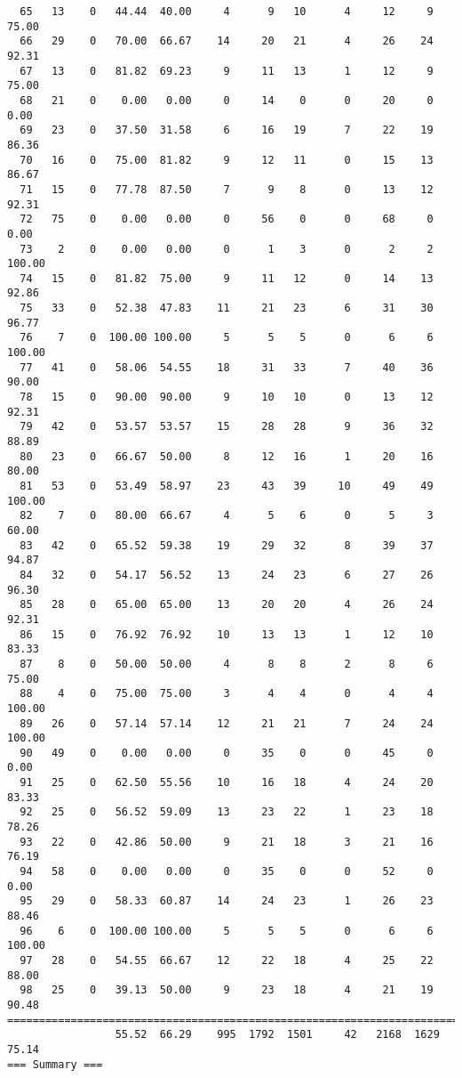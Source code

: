 \begin{verbatim}
  65   13    0   44.44  40.00     4      9   10      4     12     9    75.00
  66   29    0   70.00  66.67    14     20   21      4     26    24    92.31
  67   13    0   81.82  69.23     9     11   13      1     12     9    75.00
  68   21    0    0.00   0.00     0     14    0      0     20     0     0.00
  69   23    0   37.50  31.58     6     16   19      7     22    19    86.36
  70   16    0   75.00  81.82     9     12   11      0     15    13    86.67
  71   15    0   77.78  87.50     7      9    8      0     13    12    92.31
  72   75    0    0.00   0.00     0     56    0      0     68     0     0.00
  73    2    0    0.00   0.00     0      1    3      0      2     2   100.00
  74   15    0   81.82  75.00     9     11   12      0     14    13    92.86
  75   33    0   52.38  47.83    11     21   23      6     31    30    96.77
  76    7    0  100.00 100.00     5      5    5      0      6     6   100.00
  77   41    0   58.06  54.55    18     31   33      7     40    36    90.00
  78   15    0   90.00  90.00     9     10   10      0     13    12    92.31
  79   42    0   53.57  53.57    15     28   28      9     36    32    88.89
  80   23    0   66.67  50.00     8     12   16      1     20    16    80.00
  81   53    0   53.49  58.97    23     43   39     10     49    49   100.00
  82    7    0   80.00  66.67     4      5    6      0      5     3    60.00
  83   42    0   65.52  59.38    19     29   32      8     39    37    94.87
  84   32    0   54.17  56.52    13     24   23      6     27    26    96.30
  85   28    0   65.00  65.00    13     20   20      4     26    24    92.31
  86   15    0   76.92  76.92    10     13   13      1     12    10    83.33
  87    8    0   50.00  50.00     4      8    8      2      8     6    75.00
  88    4    0   75.00  75.00     3      4    4      0      4     4   100.00
  89   26    0   57.14  57.14    12     21   21      7     24    24   100.00
  90   49    0    0.00   0.00     0     35    0      0     45     0     0.00
  91   25    0   62.50  55.56    10     16   18      4     24    20    83.33
  92   25    0   56.52  59.09    13     23   22      1     23    18    78.26
  93   22    0   42.86  50.00     9     21   18      3     21    16    76.19
  94   58    0    0.00   0.00     0     35    0      0     52     0     0.00
  95   29    0   58.33  60.87    14     24   23      1     26    23    88.46
  96    6    0  100.00 100.00     5      5    5      0      6     6   100.00
  97   28    0   54.55  66.67    12     22   18      4     25    22    88.00
  98   25    0   39.13  50.00     9     23   18      4     21    19    90.48
============================================================================
                 55.52  66.29    995  1792  1501     42   2168  1629    75.14
=== Summary ===


\end{verbatim}
